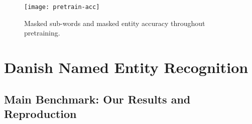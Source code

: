 \documentclass[main.tex]{subfiles}
\begin{document}
\begin{figure}[H]
    \centering
    \texttt{[image: pretrain-acc]}
    \caption{Masked sub-words and masked entity accuracy throughout pretraining.}
    \label{fig:pretrain-acc}
\end{figure}\noindent

\section{Danish Named Entity Recognition}%
\label{sec:nerres}
\subsection{Main Benchmark: Our Results and Reproduction}





\end{document}
